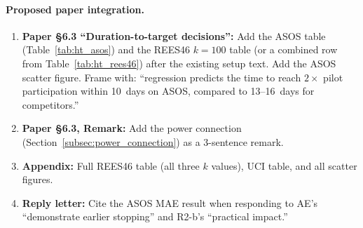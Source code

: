 {\paragraph{Proposed paper integration.}
\begin{enumerate}[leftmargin=*]
  \item \textbf{Paper \S6.3 ``Duration-to-target decisions'':}
        Add the ASOS table (Table~\ref{tab:ht_asos}) and the REES46
        $k = 100$ table (or a combined row from Table~\ref{tab:ht_rees46})
        after the existing setup text.
        Add the ASOS scatter figure.
        Frame with: ``\nbmodel regression predicts the time to reach
        $2\times$ pilot participation within 10~days on ASOS, compared
        to 13--16~days for competitors.''
  \item \textbf{Paper \S6.3, Remark:}
        Add the power connection (Section~\ref{subsec:power_connection})
        as a 3-sentence remark.
  \item \textbf{Appendix:}
        Full REES46 table (all three $k$ values), UCI table, and all
        scatter figures.
  \item \textbf{Reply letter:}
        Cite the ASOS MAE result when responding to AE's ``demonstrate
        earlier stopping'' and R2-b's ``practical impact.''
\end{enumerate}

}%

